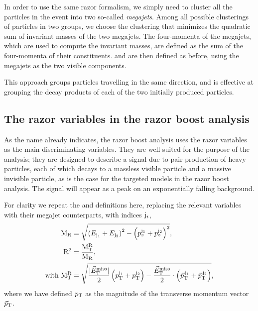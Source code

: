 In order to use the same razor formalism, we simply need to cluster all the particles in the event
into two so-called \textit{megajets}. Among all possible clusterings of particles in two groups, we
choose the clustering that minimizes the quadratic sum of invariant masses of the two megajets. The
four-momenta of the megajets, which are used to compute the invariant masses, are defined as the sum
of the four-momenta of their constituents. \mr and \rsq are then defined as before, using the
megajets as the two visible components. 

This approach groups particles travelling in the same direction, and is effective at grouping the
decay products of each of the two initially produced particles. 


\subsection{The razor variables in the razor boost analysis}

As the name already indicates, the razor boost analysis uses the razor variables as the main
discriminating variables. They are well suited for the purpose of the analysis; they are
designed to describe a signal due to pair production of heavy particles, each of which decays to a
massless visible particle and a massive invisible particle, as is the case for the targeted models
in the razor boost analysis. The signal will appear as a peak on an exponentially falling
background. 

For clarity we repeat the \mr and \rsq definitions here, replacing the relevant variables with their
megajet counterparts, with indices ${\rm j}_i$, 
\begin{align}
  \mathrm{M_R} &= \sqrt{\left( E_{{\rm j}_1} + E_{{\rm j}_2}\right)^2 - \left( p_{z}^{{\rm j}_1} +
p_{z}^{{\rm j}_2} \right)^2} ,\\
  \mathrm{R^2} &= \frac{\mathrm{M_T^R}}{\mathrm{M_R}} ,\\
  \textrm{with } \mathrm{M_T^R} &= \sqrt{\frac{|{\vec E}_{\mathrm{T}}^{\text{miss}}|}{2} \left(p_{\mathrm{T}}^{{\rm j}_1} + p_{\mathrm{T}}^{{\rm j}_2}
\right) - \frac{{\vec E}_{\mathrm{T}}^{\text{miss}}}{2} \cdot \left({\vec p}_{\mathrm{T}}^{\,{\rm j}_1} + {\vec p}_{\mathrm{T}}^{\,{\rm j}_2}
\right)} ,
\end{align}
where we have defined $p_{\mathrm{T}}$ as the magnitude of the transverse momentum vector ${\vec p}_{\mathrm{T}}$. 

